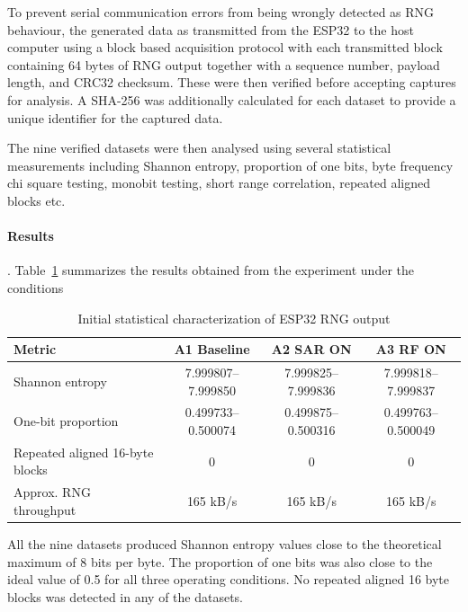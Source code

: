 \documentclass[a4paper, 12pt]{article}
\begin{document}
To prevent serial communication errors from being wrongly detected as
RNG behaviour, the generated data as transmitted from the ESP32 to the host
computer using a block based acquisition protocol with each transmitted block
containing 64 bytes of RNG output together with a sequence number, payload
length, and CRC32 checksum. These were then verified before
accepting captures for analysis. A SHA-256 was additionally calculated
for each dataset to provide a unique identifier for the captured
data.

The nine verified datasets were then analysed using several
statistical measurements including Shannon entropy, proportion of one
bits, byte frequency chi square testing, monobit testing, short range
correlation, repeated aligned blocks etc.

\paragraph{Results}.
Table~\ref{tab:esp32_initial_results} summarizes the results obtained from the experiment under the conditions

\begin{table}[htbp]
    \centering
    \caption{Initial statistical characterization of ESP32 RNG output}
    \label{tab:esp32_initial_results}
    \begin{tabular}{lccc}
        \toprule
        \textbf{Metric} &
        \textbf{A1 Baseline} &
        \textbf{A2 SAR ON} &
        \textbf{A3 RF ON} \\
        \midrule

        Shannon entropy
        & 7.999807--7.999850
        & 7.999825--7.999836
        & 7.999818--7.999837 \\

        One-bit proportion
        & 0.499733--0.500074
        & 0.499875--0.500316
        & 0.499763--0.500049 \\

        Repeated aligned 16-byte blocks
        & 0 & 0 & 0 \\

        Approx. RNG throughput
        & 165 kB/s & 165 kB/s & 165 kB/s \\

        \bottomrule
    \end{tabular}
\end{table}

All the nine datasets produced Shannon entropy values close to the theoretical
maximum of 8 bits per byte. The proportion of one bits was also close to the
ideal value of 0.5 for all three operating conditions. No repeated aligned
16 byte blocks was detected in any of the datasets.
\end{document}

